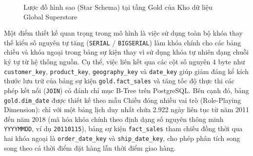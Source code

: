 \begin{figure}[H]
\caption{Lược đồ hình sao (Star Schema) tại tầng Gold của Kho dữ liệu Global Superstore}
\label{fig:star_schema}
\end{figure}

Một điểm thiết kế quan trọng trong mô hình là việc sử dụng toàn bộ khóa thay thế kiểu số nguyên tự tăng (\texttt{SERIAL} / \texttt{BIGSERIAL}) làm khóa chính cho các bảng chiều và khóa ngoại trong bảng sự kiện thay vì sử dụng khóa tự nhiên dạng chuỗi ký tự từ hệ thống nguồn. Cụ thể, việc liên kết qua các cột số nguyên 4 byte như \texttt{customer\_key}, \texttt{product\_key}, \texttt{geography\_key} và \texttt{date\_key} giúp giảm đáng kể kích thước lưu trữ của bảng sự kiện \texttt{gold.fact\_sales} và tăng tốc độ thực thi các phép kết nối (\texttt{JOIN}) có đánh chỉ mục B-Tree trên PostgreSQL. Bên cạnh đó, bảng \texttt{gold.dim\_date} được thiết kế theo mẫu Chiều đóng nhiều vai trò (Role-Playing Dimension): chỉ với một bảng lịch duy nhất chứa 2.922 ngày liên tục từ năm 2011 đến năm 2018 (mã hóa khóa chính theo định dạng số nguyên thông minh \texttt{YYYYMMDD}, ví dụ \texttt{20110115}), bảng sự kiện \texttt{fact\_sales} tham chiếu đồng thời qua hai khóa ngoại là \texttt{order\_date\_key} và \texttt{ship\_date\_key}, cho phép phân tích song song theo cả thời điểm đặt hàng lẫn thời điểm giao hàng.

